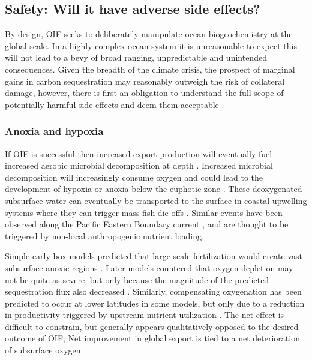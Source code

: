 \subsection{Safety: Will it have adverse side effects?} 

By design, OIF seeks to deliberately manipulate ocean biogeochemistry at the global scale. In a highly complex ocean system it is unreasonable to expect this will not lead to a bevy of broad ranging, unpredictable and unintended consequences. Given the breadth of the climate crisis, the prospect of marginal gains in carbon sequestration may reasonably outweigh the risk of collateral damage, however, there is first an obligation to understand the full scope of potentially harmful side effects and deem them acceptable \parencite{BuesselerOceanIronFertilization2008,CullenPredictingverifyingintended2008}.

\subsubsection{Anoxia and hypoxia} 

If OIF is successful then increased export production will eventually fuel increased aerobic microbial decomposition at depth \parencite{CullenPredictingverifyingintended2008}. Increased microbial decomposition will increasingly consume oxygen and could lead to the development of hypoxia or anoxia below the euphotic zone \parencite{YoonOceanIronFertilization2016}. These deoxygenated subsurface water can eventually be transported to the surface in coastal upwelling systems where they can trigger mass fish die offs \parencite{CullenPredictingverifyingintended2008}.  Similar events have been observed along the Pacific Eastern Boundary current \parencite{GranthamUpwellingdrivennearshorehypoxia2004, ChanEmergenceAnoxiaCalifornia2008}, and are thought to be triggered by non-local anthropogenic nutrient loading.

Simple early box-models predicted that large scale fertilization would create vast subsurface anoxic regions \parencite{SarmientoThreedimensionalsimulationsimpact1991}. Later models countered that oxygen depletion may not be quite as severe, but only because the magnitude of the predicted sequestration flux also decreased \parencite{DenmanClimatechangeocean2008}. Similarly, compensating oxygenation has been predicted to occur at lower latitudes in some models, but only due to a reduction in productivity triggered by upstream nutrient utilization \parencite{OschliesSideeffectsaccounting2010}. The net effect is difficult to constrain, but generally appears qualitatively opposed to the desired outcome of OIF; Net improvement in global export is tied to a net deterioration of subsurface oxygen. 

